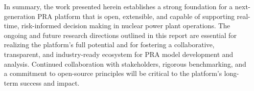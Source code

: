 In summary, the work presented herein establishes a strong foundation for a next-generation PRA platform that is open, extensible, and capable of supporting real-time, risk-informed decision making in nuclear power plant operations. The ongoing and future research directions outlined in this report are essential for realizing the platform's full potential and for fostering a collaborative, transparent, and industry-ready ecosystem for PRA model development and analysis. Continued collaboration with stakeholders, rigorous benchmarking, and a commitment to open-source principles will be critical to the platform's long-term success and impact.

\begin{comment}
\section{Advanced Uncertainty Propagation}
\section{Variance Reduction Techniques}
\end{comment}